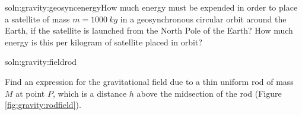 \begin{problem}{soln:gravity:geosyncenergy}{\label{prob:gravity:geosyncenergy}How much energy must be expended in order to place a satellite of mass $m=\SI{1000}{kg}$ in a geosynchronous circular orbit around the Earth, if the satellite is launched from the North Pole of the Earth? How much energy is this per kilogram of satellite placed in orbit?}
\end{problem}

\begin{problem}{soln:gravity:fieldrod}{\label{prob:gravity:fieldrod}Find an expression for the gravitational field due to a thin uniform rod of mass $M$ at point $P$, which is a distance $h$ above the midsection of the rod (Figure \ref{fig:gravity:rodfield}).

}
\end{problem}

\newpage
